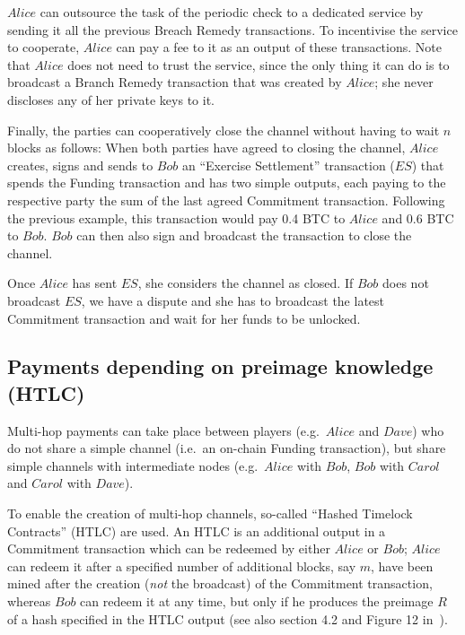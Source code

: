     $Alice$ can outsource the task of the periodic check to a dedicated service by sending
    it all the previous Breach Remedy transactions. To incentivise the service to
    cooperate, $Alice$ can pay a fee to it as an output of these transactions. Note that
    $Alice$ does not need to trust the service, since the only thing it can do is to
    broadcast a Branch Remedy transaction that was created by $Alice$; she never discloses
    any of her private keys to it.

    Finally, the parties can cooperatively close the channel without having to wait $n$
    blocks as follows: When both parties have agreed to closing the channel, $Alice$
    creates, signs and sends to $Bob$ an ``Exercise Settlement'' transaction ($ES$) that
    spends the Funding transaction and has two simple outputs, each paying to the
    respective party the sum of the last agreed Commitment transaction. Following the
    previous example, this transaction would pay 0.4 BTC to $Alice$ and 0.6 BTC to $Bob$.
    $Bob$ can then also sign and broadcast the transaction to close the channel.

    Once $Alice$ has sent $ES$, she considers the channel as closed. If $Bob$ does not
    broadcast $ES$, we have a dispute and she has to broadcast the latest Commitment
    transaction and wait for her funds to be unlocked.

  \subsection{Payments depending on preimage knowledge (HTLC)}
    Multi-hop payments can take place between players (e.g.\ $Alice$ and $Dave$) who do not
    share a simple channel (i.e.\ an on-chain Funding transaction), but share simple
    channels with intermediate nodes (e.g.\ $Alice$ with $Bob$, $Bob$ with $Carol$ and
    $Carol$ with $Dave$).

    To enable the creation of multi-hop channels, so-called ``Hashed Timelock Contracts''
    (HTLC) are used. An HTLC is an additional output in a Commitment transaction which can
    be redeemed by either $Alice$ or $Bob$; $Alice$ can redeem it after a specified number
    of additional blocks, say $m$, have been mined after the creation (\textit{not} the
    broadcast) of the Commitment transaction, whereas $Bob$ can redeem it at any time, but
    only if he produces the preimage $R$ of a hash specified in the HTLC output (see also
    section 4.2 and Figure 12 in~\cite{lightning}).

